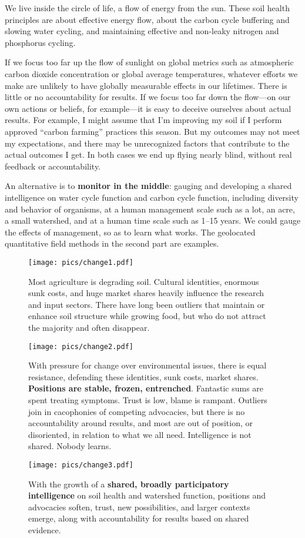 \documentclass[11pt,letterpaper,twoside,onecolumn]{memoir}
\begin{document}
We live inside the circle of life, a flow of energy from the sun. These soil health principles are about effective energy flow, about the carbon cycle buffering and slowing water cycling, and maintaining effective and non-leaky nitrogen and phosphorus cycling. 

If we focus too far up the flow of sunlight on global metrics such as atmospheric carbon dioxide concentration or global average temperatures, whatever efforts we make are unlikely to have globally measurable effects in our lifetimes. There is little or no accountability for results. If we focus too far down the flow---on our own actions or beliefs, for example---it is easy to deceive ourselves about actual results. For example, I might assume that I'm improving my soil if I perform approved ``carbon farming'' practices this season. But my outcomes may not meet my expectations, and there may be unrecognized factors that contribute to the actual outcomes I get. In both cases we end up flying nearly blind, without real feedback or accountability.

An alternative is to \textbf{monitor in the middle}: gauging and developing a shared intelligence on water cycle function and carbon cycle function, including diversity and behavior of organisms, at a human management scale such as a lot, an acre, a small watershed, and at a human time scale such as 1--15 years. We could gauge the effects of management, so as to learn what works. The geolocated quantitative field methods in the second part are examples. 


\begin{figure}
\texttt{[image: pics/change1.pdf]}
\caption*{Most agriculture is degrading soil. Cultural identities, enormous sunk costs, and huge market shares heavily influence the research and input sectors. There have long been outliers that maintain or enhance soil structure while growing food, but who do not attract the majority and often disappear.}
\texttt{[image: pics/change2.pdf]}
\caption*{With pressure for change over environmental issues, there is equal resistance, defending these identities, sunk costs, market shares. \textbf{Positions are stable, frozen, entrenched}. Fantastic sums are spent treating symptoms. Trust is low, blame is rampant. Outliers join in cacophonies of competing advocacies, but there is no accountability around results, and most are out of position, or disoriented, in relation to what we all need. Intelligence is not shared. Nobody learns.}
\texttt{[image: pics/change3.pdf]}
\caption*{With the growth of a \textbf{shared, broadly participatory intelligence} on soil health and watershed function, positions and advocacies soften, trust, new possibilities, and larger contexts emerge, along with accountability for results based on shared evidence.}
\end{figure}
\end{document}
